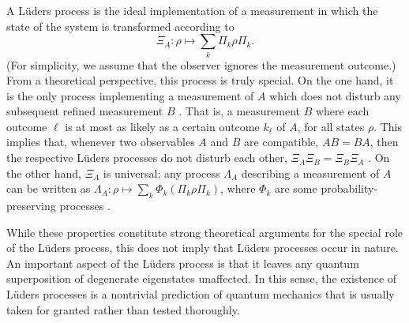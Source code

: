 \documentclass[
aps,prl,
reprint,
a4paper,
superscriptaddress,
floatfix,
]{revtex4-1}
\begin{document}
A Lüders process is the ideal implementation of a measurement in which the 
 state of the system is transformed according to \cite{Heinosaari12}
%
\begin{equation}
 \Xi_A\colon \rho\mapsto \sum_k \Pi_k \rho \Pi_k.
\end{equation}
%
(For simplicity, we assume that the observer ignores the measurement outcome.)
From a theoretical perspective, this process is truly special.
On the one hand, it is the only process implementing a measurement of $A$ which 
 does not disturb any subsequent refined measurement $B$ \cite{Chiribella14, Kleinmann14}.
That is, a measurement $B$ where each outcome $\ell$ is at most as likely as a 
 certain outcome $k_{\ell}$ of $A$, for all states $\rho$.
This implies that, whenever two observables $A$ and $B$ are compatible, $AB= 
 BA$, then the respective Lüders processes do not disturb each other, 
 $\Xi_A\Xi_B= \Xi_B\Xi_A$ \cite{Luders51, Heinosaari12}.
On the other hand, $\Xi_A$ is universal: any process $\Lambda_A$ describing a 
 measurement of $A$ can be written as $\Lambda_A\colon \rho \mapsto 
 \sum_k\Phi_k(\Pi_k\rho\Pi_k)$, where $\Phi_k$ are some probability-preserving 
 processes \cite{Heinosaari12}.

While these properties constitute strong theoretical arguments for the special 
 role of the Lüders process, this does not imply that Lüders processes occur in nature.
An important aspect of the Lüders process is that it leaves any quantum 
 superposition of degenerate eigenstates unaffected.
In this sense, the existence of Lüders processes is a nontrivial prediction of 
 quantum mechanics that is usually taken for granted rather than tested 
 thoroughly.
\end{document}
